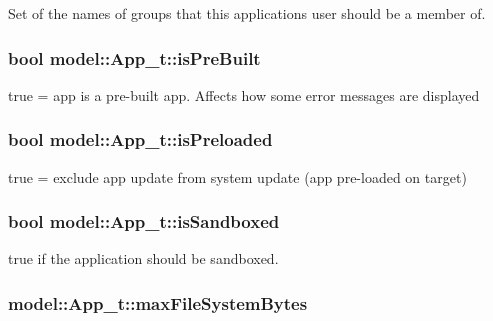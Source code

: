 Set of the names of groups that this application\textquotesingle{}s user should be a member of. 

\subsubsection[{\texorpdfstring{is\+Pre\+Built}{isPreBuilt}}]{\setlength{\rightskip}{0pt plus 5cm}bool model\+::\+App\+\_\+t\+::is\+Pre\+Built}\hypertarget{structmodel_1_1_app__t_ae6dc949c8deecb9dea1ad97dc014083e}{}\label{structmodel_1_1_app__t_ae6dc949c8deecb9dea1ad97dc014083e}
true = app is a pre-\/built app. Affects how some error messages are displayed 
\subsubsection[{\texorpdfstring{is\+Preloaded}{isPreloaded}}]{\setlength{\rightskip}{0pt plus 5cm}bool model\+::\+App\+\_\+t\+::is\+Preloaded}\hypertarget{structmodel_1_1_app__t_acee00d508f8d26723d378f7944e197e2}{}\label{structmodel_1_1_app__t_acee00d508f8d26723d378f7944e197e2}


true = exclude app update from system update (app pre-\/loaded on target) 

\subsubsection[{\texorpdfstring{is\+Sandboxed}{isSandboxed}}]{\setlength{\rightskip}{0pt plus 5cm}bool model\+::\+App\+\_\+t\+::is\+Sandboxed}\hypertarget{structmodel_1_1_app__t_aa77e246bf3880fce81456537bb1ff8f5}{}\label{structmodel_1_1_app__t_aa77e246bf3880fce81456537bb1ff8f5}


true if the application should be sandboxed. 

\subsubsection[{\texorpdfstring{max\+File\+System\+Bytes}{maxFileSystemBytes}}]{ model\+::\+App\+\_\+t\+::max\+File\+System\+Bytes}\hypertarget{structmodel_1_1_app__t_a4f666df79c6d9ae53a7567ad42ccaccb}{}\label{structmodel_1_1_app__t_a4f666df79c6d9ae53a7567ad42ccaccb}


